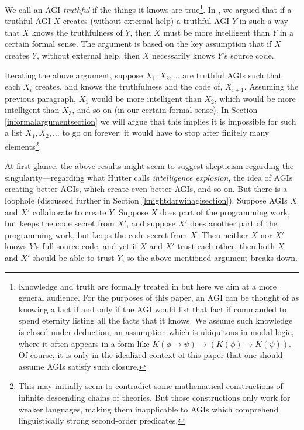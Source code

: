 \documentclass[runningheads]{llncs}
\begin{document}
We call an AGI \emph{truthful} if the things it knows
are true\footnote{Knowledge and truth are formally
treated in \cite{alexander2019measuring} but here we aim at a more general audience.
For the purposes of this paper, an AGI can be thought of as knowing a fact if and only
if the AGI would list that fact if commanded to spend eternity listing all the facts
that it knows. We assume such knowledge is closed under deduction, an assumption which
is ubiquitous in modal logic, where it often appears in a form like
$K(\phi\rightarrow\psi)\rightarrow (K(\phi)\rightarrow K(\psi))$.
Of course,
it is only in the idealized context of this paper that one should assume AGIs
satisfy such closure.}.
In \cite{alexander2019measuring}, we argued
that if a truthful AGI $X$ creates (without external help) a truthful AGI $Y$ in such a way
that $X$ knows the truthfulness
of $Y$, then $X$ must be more intelligent than $Y$
in a certain formal sense. The argument is based on the key assumption that if $X$
creates $Y$, without external help, then $X$ necessarily knows $Y$'s source code.

Iterating the above argument, suppose $X_1,X_2,\ldots$
are truthful AGIs such that each $X_i$ creates, and knows the truthfulness and
the code of, $X_{i+1}$. Assuming the previous paragraph, $X_1$ would be more
intelligent than $X_2$, which would be more
intelligent than $X_3$, and so on (in our certain formal sense).
In Section \ref{informalargumentsection} we will argue that this implies
it is impossible for such
a list $X_1,X_2,\ldots$ to go on forever: it would have to stop after finitely
many elements\footnote{This may initially seem to contradict some mathematical
constructions \cite{kripke2019ungroundedness}
\cite{visser2002semantics} of infinite descending chains of theories. But those
constructions only work for weaker languages, making them inapplicable to
AGIs which comprehend
linguistically strong second-order predicates.}.

At first glance, the above results might
seem to suggest skepticism regarding the singularity---regarding
what Hutter \cite{hutter2012} calls \emph{intelligence explosion}, the idea of
AGIs creating better AGIs, which create even better AGIs, and so on.
But there is a loophole (discussed further in
Section \ref{knightdarwinagisection}). Suppose AGIs $X$ and $X'$
collaborate to create $Y$. Suppose $X$
does part of the programming work,
but keeps the code secret from $X'$, and suppose $X'$ does another part of
the programming work, but keeps the code secret from $X$.
Then neither
$X$ nor $X'$ knows $Y$'s full source code, and yet if $X$ and $X'$ trust
each other, then both $X$ and $X'$ should be able to trust $Y$, so the above-mentioned
argument breaks down.
\end{document}
